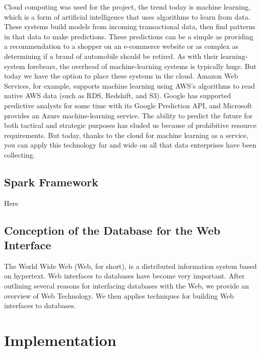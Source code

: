 \documentclass{acmtog} %
\begin{document}
Cloud computing was used for the project, the trend today is machine learning, which is a form of artificial intelligence that uses algorithms to learn from data. These systems build models from incoming transactional data, then find patterns in that data to make predictions. These predictions can be a simple as providing a recommendation to a shopper on an e-commerce website or as complex as determining if a brand of automobile should be retired. As with their learning-system forebears, the overhead of machine-learning systems is typically huge. But today we have the option to place these systems in the cloud. Amazon Web Services, for example, supports machine learning using AWS's algorithms to read native AWS data (such as RDS, Redshift, and S3). Google has supported predictive analysts for some time with its Google Prediction API, and Microsoft provides an Azure machine-learning service. The ability to predict the future for both tactical and strategic purposes has eluded us because of prohibitive resource requirements. But today, thanks to the cloud for machine learning as a service, you can apply this technology far and wide on all that data enterprises have been collecting.


\subsection{Spark Framework}
\label{subsub:spark}

Here 

\subsection{Conception of the Database for the Web Interface}
\label{subsub:conception}

The World Wide Web (Web, for short), is a distributed information system based on hypertext. Web interfaces to databases have become very important. After outlining several reasons for interfacing databases with the Web, we provide an overview of Web Technology. We then applies techniques \cite{Baltas17} for building Web interfaces to databases.


\section{Implementation}
\label{sec:implementation}
\end{document}
